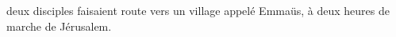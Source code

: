 \encetemps deux disciples faisaient route vers un village appelé Emmaüs,
	à deux heures de marche de Jérusalem.
